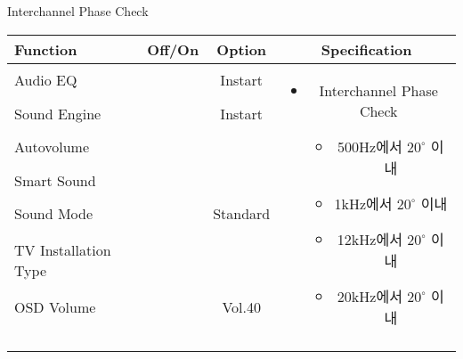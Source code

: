 \begin{frame}[t]{Interchannel Phase Check}
\begin{tiny}
\begin{tabular}{@{}lccc@{}}
\toprule
Function & Off/On & Option & Specification \\
\midrule
Audio EQ & \color{black}{Off} & Instart &
\multirow{10}{60mm}{
\begin{itemize}
\item Interchannel Phase Check
	\begin{itemize}
	\item 500Hz에서 \(20^\circ\) 이내
	\item 1kHz에서 \(20^\circ\) 이내
	\item 12kHz에서 \(20^\circ\) 이내
	\item 20kHz에서 \(20^\circ\) 이내
	\end{itemize}
\end{itemize}
} \\
Sound Engine & \color{black}{Off} & Instart & \\
Autovolume & \color{black}{Off} & & \\
Smart Sound & \color{black}{Off} & & \\
Sound Mode & \color{blue}{On} & Standard & \\
TV Installation Type & \color{blue}{On} & \color{black}{Standtype1} & \\
OSD Volume & \color{blue}{On} & Vol.40 & \\
& & & \\
& & & \\
& & & \\
& & & \\
\midrule
\end{tabular}
\end{tiny}

\end{frame}

